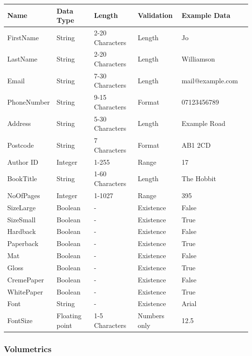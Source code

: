 \begin{center}
\begin{tabular}{|p{2.5cm}|p{2.5cm}|p{2.5cm}|p{2.5cm}|p{2.5cm}|p{3cm}|}
    \hline
    \textbf{Name} & \textbf{Data Type} & \textbf{Length} & \textbf{Validation} & \textbf{Example Data} \\ \hline
    FirstName & String & 2-20 Characters & Length & Jo  \\ \hline
    LastName & String & 2-20 Characters & Length & Williamson  \\ \hline
    Email & String & 7-30 Characters & Length & mail@example.com  \\ \hline
    PhoneNumber & String & 9-15 Characters & Format & 07123456789  \\ \hline
    Address & String & 5-30 Characters & Length & Example Road  \\ \hline
    Postcode & String & 7 Characters & Format & AB1 2CD  \\ \hline
    Author ID & Integer & 1-255 & Range & 17  \\ \hline
    BookTitle & String & 1-60 Characters & Length & The Hobbit  \\ \hline
    NoOfPages & Integer & 1-1027 & Range & 395  \\ \hline
    SizeLarge & Boolean & - & Existence & False  \\ \hline
    SizeSmall & Boolean & - & Existence & True  \\ \hline
    Hardback & Boolean & - & Existence & False  \\ \hline
    Paperback & Boolean & - & Existence & True \\ \hline
    Mat & Boolean & - & Existence & False  \\ \hline
    Gloss & Boolean & - & Existence & True  \\ \hline
    CremePaper & Boolean & - & Existence & False  \\ \hline
    WhitePaper & Boolean & - & Existence & True\\ \hline
    Font & String & - & Existence & Arial  \\ \hline
    FontSize & Floating point & 1-5 Characters & Numbers only & 12.5  \\ \hline
    \hline
\end{tabular}
\end{center}

\subsubsection{Volumetrics}

